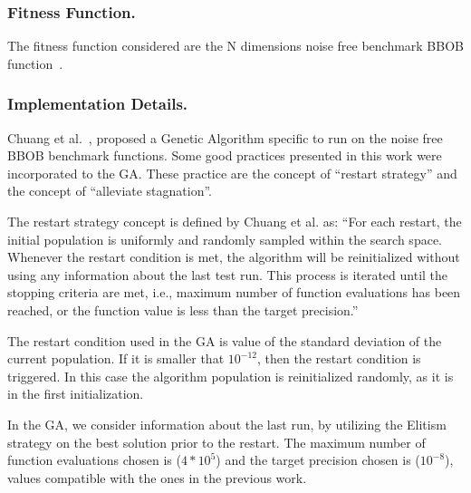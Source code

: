 \subsubsection*{Fitness Function.}
The fitness function considered are the N dimensions noise free benchmark BBOB function~\cite{hansen2010real}.


\subsubsection*{Implementation Details.}
Chuang et al.~\cite{chuang2012black}, proposed a Genetic Algorithm specific to run on the noise free BBOB benchmark functions. Some good practices presented in this work were incorporated to the GA. These practice are the concept of ``restart strategy'' and the concept of ``alleviate stagnation''.

The restart strategy concept is defined by Chuang et al. as: ``For each restart, the initial population  is uniformly and randomly sampled within the search space. Whenever the restart condition is met, the algorithm will be reinitialized without using any information about the last test run. This process is iterated until the stopping criteria are met, i.e., maximum number of function evaluations has been reached, or the function value is less than the target precision.''

The restart condition used in the GA is value of the standard deviation of the current population. If it is smaller that $10^{-12}$, then the restart condition is triggered. In this case the algorithm population is reinitialized randomly, as it is in the first initialization. 

In the GA, we consider information about the last run, by utilizing the Elitism strategy on the best solution prior to the restart. The maximum number of function evaluations chosen is ($4 * 10^5$) and the target precision chosen is ($10^{-8}$), values compatible with the ones in the previous work.


